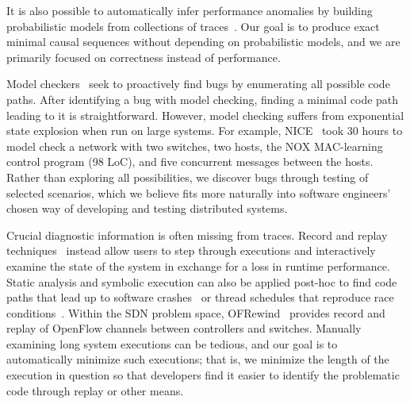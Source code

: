 It is also possible to automatically infer
performance anomalies by building probabilistic models from
collections of traces~\cite{barham2004using,Chen02pinpoint:problem}.
Our goal is to produce exact minimal causal sequences without
depending on probabilistic models, and we are primarily focused on correctness
instead of performance.

Model checkers~\cite{killian2007life,nice} seek to
proactively find bugs by enumerating all possible code paths.
After identifying a bug with model checking, finding a minimal code path leading to it is
straightforward. However, model checking suffers from exponential
state explosion when run on large systems. For example, NICE~\cite{nice} took 30 hours to
model check a network with two switches, two hosts, the NOX MAC-learning
control program (98 LoC), and five concurrent
messages between the hosts. Rather than exploring all
possibilities, we discover bugs through testing of selected scenarios,
which we believe fits more naturally into software engineers' chosen
way of developing and testing distributed systems.

\vspace{0.05in}
 Crucial diagnostic information is often missing from traces.
Record and replay techniques~\cite{Geels:2006:RDD:1267359.1267386,lin2009towards}
instead allow users to step through executions and interactively examine the
state of the system in exchange for a loss in runtime performance.
Static analysis and symbolic execution can also be applied post-hoc %
to find code paths that lead up to software
crashes~\cite{Yuan:2010:SED:1736020.1736038} or thread schedules that reproduce
race conditions~\cite{Zamfir:2010:EST:1755913.1755946}.
Within the SDN problem space, OFRewind~\cite{ofrewind} provides
record and replay of OpenFlow channels between controllers and switches.
Manually examining long system executions can be tedious, and our goal is to
automatically minimize such executions; that is, we minimize the length of
the execution in question so that developers find it easier to identify the
problematic code through replay or other means.


